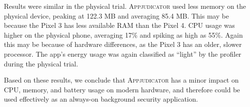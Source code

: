 Results were similar in the physical trial. \textsc{Appjudicator} used less
memory on the physical device, peaking at 122.3 MB and averaging 85.4 MB. This
may be because the Pixel 3 has less available RAM than the Pixel 4. CPU usage
was higher on the physical phone, averaging 17\% and spiking as high as 55\%.
Again this may be because of hardware differences, as the Pixel 3 has an older,
slower processor. The app's energy usage was again classified as ``light'' by
the profiler during the physical trial. 

Based on these results, we conclude that \textsc{Appjudicator} has a minor
impact on CPU, memory, and battery usage on modern hardware, and therefore could
be used effectively as an always-on background security application.

\newpage

